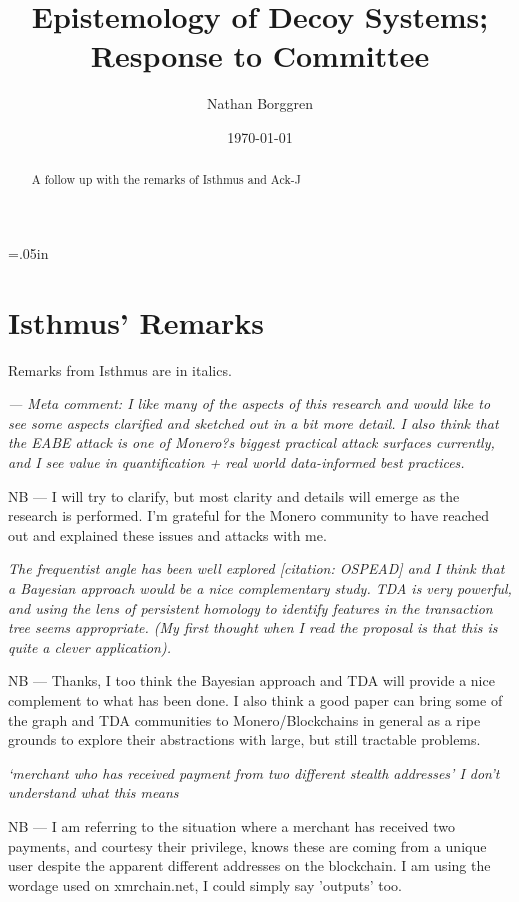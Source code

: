 \documentclass[prc, 12pt]{revtex4-1}
\begin{document}
 \topmargin=.05in
 \title{Epistemology of Decoy Systems; Response to Committee}
 \author{Nathan Borggren}
 \date{\today}

\begin{abstract}
A follow up with the remarks of Isthmus and Ack-J
\end{abstract}

\maketitle{}

\section{Isthmus' Remarks}

Remarks from Isthmus are in italics.

\textit{--- Meta comment: I like many of the aspects of this research and would like to see some aspects clarified and sketched out in a bit more detail. I also think that the EABE attack is one of Monero?s biggest practical attack surfaces currently, and I see value in quantification + real world data-informed best practices.}

NB --- I will try to clarify, but most clarity and details will emerge as the research is performed.  I'm grateful for the Monero community to have reached out and explained these issues and attacks with me.  

\textit{The frequentist angle has been well explored [citation: OSPEAD] and I think that a Bayesian approach would be a nice complementary study. TDA is very powerful, and using the lens of persistent homology to identify features in the transaction tree seems appropriate. (My first thought when I read the proposal is that this is quite a clever application).}

NB --- Thanks, I too think the Bayesian approach and TDA will provide a nice complement to what has been done.  I also think a good paper can bring some of the graph and TDA communities to Monero/Blockchains in general as a ripe grounds to explore their abstractions with large, but still tractable problems.

\textit{`merchant who has received payment from two different stealth addresses' I don't understand what this means}

NB --- I am referring to the situation where a merchant has received two payments, and courtesy their privilege, knows these are coming from a unique user despite the apparent different addresses on the blockchain.  I am using the wordage used on xmrchain.net, I could simply say 'outputs' too.
\end{document}
